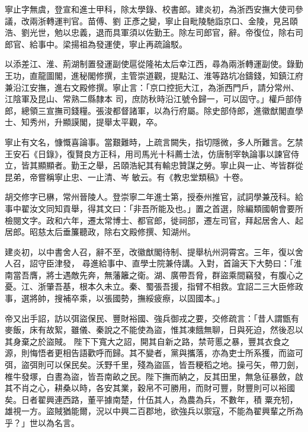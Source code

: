 \begin{pinyinscope}
 寧止字無虞，登宣和進士甲科，除太學錄、校書郎。建炎初，為浙西安撫大使司參議，改兩浙轉運判官。苗傅、劉
 正彥之變，寧止自毗陵馳詣京口、金陵，見呂頤浩、劉光世，勉以忠義，退而具軍須以佐勤王。除左司郎官，辭。帝復位，除右司郎官、給事中。梁揚祖為發運使，寧止再疏論駁。



 以添差江、淮、荊湖制置發運副使扈從隆祐太后幸江西，尋為兩浙轉運副使。錄勤王功，直龍圖閣，進秘閣修撰，主管崇道觀，提點江、淮等路坑冶鑄錢，知鎮江府兼沿江安撫，進右文殿修撰。寧止言：「京口控扼大江，為浙西門戶，請分常州、江陰軍及昆山、常熟二縣隸本
 司，庶防秋時沿江號令歸一，可以固守。」權戶部侍郎，總領三宣撫司錢糧。張浚都督諸軍，以為行府屬。除史部侍郎，進徽猷閣直學士、知秀州，升顯謨閣，提舉太平觀，卒。



 寧止有文名，慷慨喜論事。當艱難時，上疏言闕失，指切隱微，多人所難言。乞禁王安石《日錄》，復賢良方正科，用司馬光十科薦士法，仿唐制宰執論事以諫官侍立，皆其顯顯者。勤王之舉，呂頤浩紀其有輸忠贊謀之勞。寧止與一止、岑皆群從昆弟，帝嘗稱寧止忠、一止清、岑
 敏云。有《教忠堂類稿》十卷。



 胡交修字已楙，常州晉陵人。登崇寧二年進士第，授泰州推官，試詞學兼茂科。給事中翟汝文同知貢舉，得其文曰：「非吾所能及也。」置之首選，除編類國朝會要所檢閱文字。政和六年，遷太常博士、都官郎，徙祠部，遷左司官，拜起居舍人、起居郎。昭慈太后垂簾聽政，除右文殿修撰、知湖州。



 建炎初，以中書舍人召，辭不至，改徽猷閣待制、提舉杭州洞霄宮。三年，復以舍人召，詔守臣津發，
 尋進給事中、直學士院兼侍講。入對，首論天下大勢曰：「淮南當吾膺，將士遇敵先奔，無藩籬之衛。湖、廣帶吾脅，群盜乘間竊發，有腹心之憂。江、浙肇吾基，根本久未立。秦、蜀張吾援，指臂不相救。宜詔二三大臣修政事，選將帥，搜補卒乘，以張國勢，撫綏疲瘵，以固國本。」



 帝又出手詔，訪以弭盜保民、豐財裕國、強兵御戎之要，交修疏言：「昔人謂甑有麥飯，床有故絮，雖儀、秦說之不能使為盜，惟其凍餓無聊，日與死迫，然後忍以其身棄之於盜賊。
 陛下下寬大之詔，開其自新之路，禁苛慝之暴，豐其衣食之源，則悔悟者更相告語歡呼而歸。其不變者，黨與攜落，亦為吏士所系獲，而盜可弭，盜弭則可以保民矣。沃野千里，殘為盜區，皆吾粳稻之地。操弓矢，帶刀劍，椎牛發塚，白晝為盜，皆吾南畝之民。陛下撫而納之，反其田里，無急征暴斂，啟其不肖之心，耕桑以時，各安其業，穀帛不可勝用，而財可豐，財豐則可以裕國矣。日者翟興連西路，董平據南楚，什伍其人，為農為兵，不數年，積
 粟充牣，雄視一方。盜賊猶能爾，況以中興二百郡地，欲強兵以禦寇，不能為翟興輩之所為乎？」世以為名言。




\end{pinyinscope}
